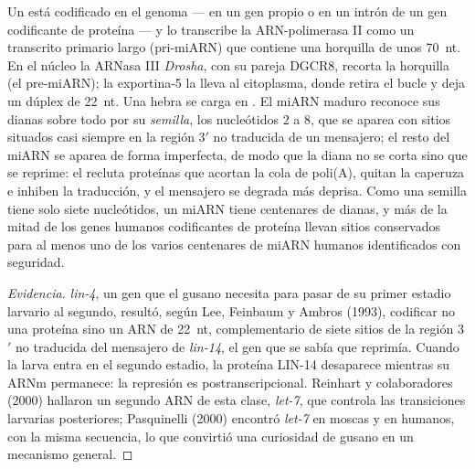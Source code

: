 \begin{definition}[MicroARN]\label{def:b3:rna-regulation:mirna}
Un \emph{} está codificado en el genoma --- en un gen propio o en
un intrón de un gen codificante de proteína --- y lo transcribe la
ARN-polimerasa II como un transcrito primario largo (pri-miARN) que
contiene una horquilla de unos \qty{70}{nt}. En el núcleo la ARNasa III
\emph{Drosha}, con su pareja DGCR8, recorta la horquilla (el pre-miARN);
la exportina-5 la lleva al citoplasma, donde  retira el bucle y deja
un dúplex de \qty{22}{nt}. Una hebra se carga en . El miARN
maduro reconoce sus dianas sobre todo por su \emph{semilla}, los
nucleótidos 2 a 8, que se aparea con sitios situados casi siempre en la
región 3$'$ no traducida de un mensajero; el resto del miARN se aparea de
forma imperfecta, de modo que la diana no se corta sino que se reprime:
el  recluta proteínas que acortan la cola de poli(A), quitan la
caperuza e inhiben la traducción, y el mensajero se degrada más deprisa.
Como una semilla tiene solo siete nucleótidos, un miARN tiene centenares
de dianas, y más de la mitad de los genes humanos codificantes de
proteína llevan sitios conservados para al menos uno de los varios
centenares de miARN humanos identificados con seguridad.
\end{definition}

\begin{proof}[Evidencia]
\emph{lin-4}, un gen que el gusano necesita para pasar de su primer
estadio larvario al segundo, resultó, según Lee, Feinbaum y Ambros
(1993), codificar no una proteína sino un ARN de \qty{22}{nt},
complementario de siete sitios de la región 3$'$ no traducida del
mensajero de \emph{lin-14}, el gen que se sabía que reprimía. Cuando la
larva entra en el segundo estadio, la proteína LIN-14 desaparece mientras
su ARNm permanece: la represión es postranscripcional. Reinhart y
colaboradores (2000) hallaron un segundo ARN de esta clase,
\emph{let-7}, que controla las transiciones larvarias posteriores;
Pasquinelli (2000) encontró \emph{let-7} en moscas y en humanos, con la
misma secuencia, lo que convirtió una curiosidad de gusano en un
mecanismo general.
\end{proof}

